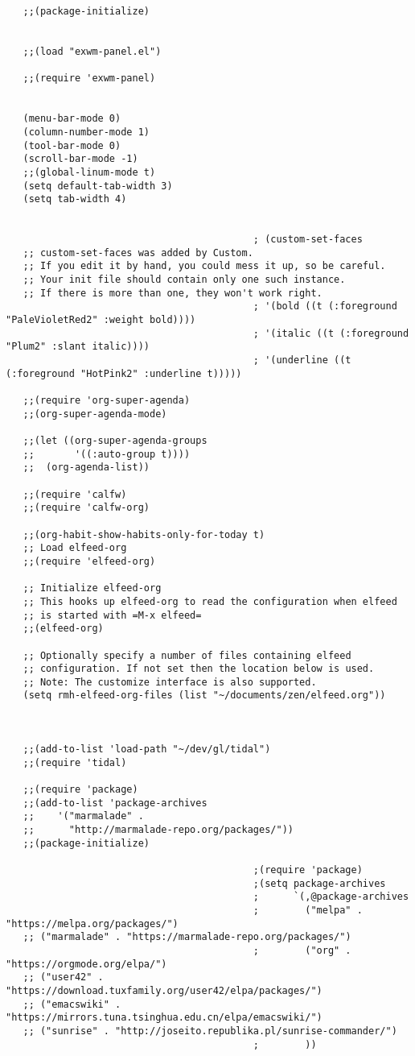 \documentclass[11pt]{article}
\begin{document}
\begin{verbatim}
   ;;(package-initialize)


   ;;(load "exwm-panel.el")

   ;;(require 'exwm-panel)


   (menu-bar-mode 0)
   (column-number-mode 1)
   (tool-bar-mode 0)
   (scroll-bar-mode -1)
   ;;(global-linum-mode t)
   (setq default-tab-width 3)
   (setq tab-width 4)


                                           ; (custom-set-faces
   ;; custom-set-faces was added by Custom.
   ;; If you edit it by hand, you could mess it up, so be careful.
   ;; Your init file should contain only one such instance.
   ;; If there is more than one, they won't work right.
                                           ; '(bold ((t (:foreground "PaleVioletRed2" :weight bold))))
                                           ; '(italic ((t (:foreground "Plum2" :slant italic))))
                                           ; '(underline ((t (:foreground "HotPink2" :underline t)))))

   ;;(require 'org-super-agenda)
   ;;(org-super-agenda-mode)

   ;;(let ((org-super-agenda-groups
   ;;       '((:auto-group t))))
   ;;  (org-agenda-list))

   ;;(require 'calfw)
   ;;(require 'calfw-org)

   ;;(org-habit-show-habits-only-for-today t)
   ;; Load elfeed-org
   ;;(require 'elfeed-org)

   ;; Initialize elfeed-org
   ;; This hooks up elfeed-org to read the configuration when elfeed
   ;; is started with =M-x elfeed=
   ;;(elfeed-org)

   ;; Optionally specify a number of files containing elfeed
   ;; configuration. If not set then the location below is used.
   ;; Note: The customize interface is also supported.
   (setq rmh-elfeed-org-files (list "~/documents/zen/elfeed.org"))



   ;;(add-to-list 'load-path "~/dev/gl/tidal")
   ;;(require 'tidal)

   ;;(require 'package)
   ;;(add-to-list 'package-archives 
   ;;    '("marmalade" .
   ;;      "http://marmalade-repo.org/packages/"))
   ;;(package-initialize)

                                           ;(require 'package)
                                           ;(setq package-archives
                                           ;      `(,@package-archives
                                           ;        ("melpa" . "https://melpa.org/packages/")
   ;; ("marmalade" . "https://marmalade-repo.org/packages/")
                                           ;        ("org" . "https://orgmode.org/elpa/")
   ;; ("user42" . "https://download.tuxfamily.org/user42/elpa/packages/")
   ;; ("emacswiki" . "https://mirrors.tuna.tsinghua.edu.cn/elpa/emacswiki/")
   ;; ("sunrise" . "http://joseito.republika.pl/sunrise-commander/")
                                           ;        ))


\end{verbatim}
\end{document}
